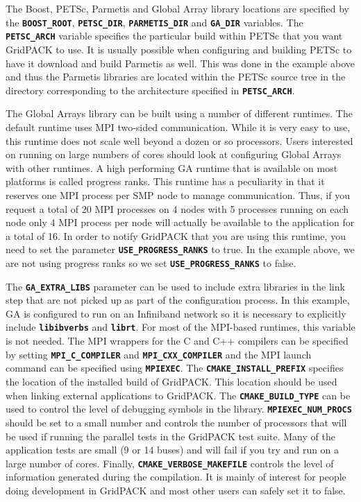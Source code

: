\documentclass[12pt]{report} %
\begin{document}
The Boost, PETSc, Parmetis and Global Array library locations are specified by the \texttt{\textbf{BOOST\_ROOT}}, \texttt{\textbf{PETSC\_DIR}}, \texttt{\textbf{PARMETIS\_DIR}} and \texttt{\textbf{GA\_DIR}} variables. The \texttt{\textbf{PETSC\_ARCH}} variable specifies the particular build within PETSc that you want GridPACK to use. It is usually possible when configuring and building PETSc to have it download and build Parmetis as well. This was done in the example above and thus the Parmetis libraries are located within the PETSc source tree in the directory corresponding to the architecture specified in \texttt{\textbf{PETSC\_ARCH}}.

The Global Arrays library can be built using a number of different runtimes. The default runtime uses MPI two-sided communication. While it is very easy to use, this runtime does not scale well beyond a dozen or so processors. Users interested on running on large numbers of cores should look at configuring Global Arrays with other runtimes. A high performing GA runtime that is available on most platforms is called progress ranks. This runtime has a peculiarity in that it reserves one MPI process per SMP node to manage communication. Thus, if you request a total of 20 MPI processes on 4 nodes with 5 processes running on each node only 4 MPI process per node will actually be available to the application for a total of 16. In order to notify GridPACK that you are using this runtime, you need to set the parameter \texttt{\textbf{USE\_PROGRESS\_RANKS}} to true. In the example above, we are not using progress ranks so we set \texttt{\textbf{USE\_PROGRESS\_RANKS}} to false.

The \texttt{\textbf{GA\_EXTRA\_LIBS}} parameter can be used to include extra libraries in the link step that are not picked up as part of the configuration process. In this example, GA is configured to run on an Infiniband network so it is necessary to explicitly include \texttt{\textbf{libibverbs}} and \texttt{\textbf{librt}}. For most of the MPI-based runtimes, this variable is not needed.
The MPI wrappers for the C and C++ compilers can be specified by setting \texttt{\textbf{MPI\_C\_COMPILER}} and \texttt{\textbf{MPI\_CXX\_COMPILER}} and the MPI launch command can be specified using \texttt{\textbf{MPIEXEC}}. The \texttt{\textbf{CMAKE\_INSTALL\_PREFIX}} specifies the location of the installed build of GridPACK. This location should be used when linking external applications to GridPACK. The \texttt{\textbf{CMAKE\_BUILD\_TYPE}} can be used to control the level of debugging symbols in the library. \texttt{\textbf{MPIEXEC\_NUM\_PROCS}} should be set to a small number and controls the number of processors that will be used if running the parallel tests in the GridPACK test suite. Many of the application tests are small (9 or 14 buses) and will fail if you try and run on a large number of cores. Finally, \texttt{\textbf{CMAKE\_VERBOSE\_MAKEFILE}} controls the level of information generated during the compilation. It is mainly of interest for people doing development in GridPACK and most other users can safely set it to false.
\end{document}
